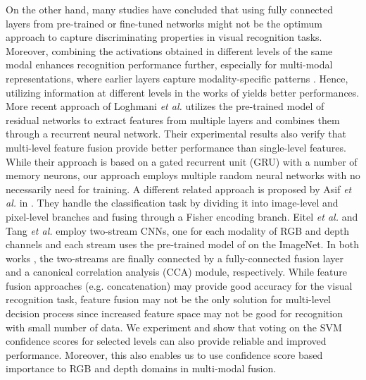 \documentclass[10pt,journal,compsoc]{IEEEtran}
\begin{document}
On the other hand, many studies \cite{Liu_CVPR_2015, Zaki_ICRA_2016, Zaki_RAS_2017, Song_IJCAI_2017, Caglayan_ECCVW_2018} have concluded that using fully connected layers from pre-trained or fine-tuned networks might not be the optimum approach to capture discriminating properties in visual recognition tasks. Moreover, combining the activations obtained in different levels of the same modal enhances recognition performance further, especially for multi-modal representations, where earlier layers capture modality-specific patterns \cite{Yang_ICCV_2015, Song_IJCAI_2017, Caglayan_ECCVW_2018}. Hence, utilizing information at different levels in the works of \cite{Yang_ICCV_2015, Zaki_ICRA_2016, Zaki_RAS_2017, Song_IJCAI_2017, Caglayan_ECCVW_2018, Zaki_AuotRobots_2019} yields better performances. More recent approach of Loghmani \textit{et al.} \cite{Loghmani_RAL_2019} utilizes the pre-trained model of residual networks \cite{He_CVPR_2016} to extract features from multiple layers and combines them through a recurrent neural network. Their experimental results also verify that multi-level feature fusion provide better performance than single-level features. While their approach is based on a gated recurrent unit (GRU) \cite{Cho_EMNLP_2014} with a number of memory neurons, our approach employs multiple random neural networks with no necessarily need for training. A different related approach is proposed by Asif \textit{et al.} in \cite{Asif_TPAMI_2018}. They handle the classification task by dividing it into image-level and pixel-level branches and fusing through a Fisher encoding branch. Eitel \textit{et al.} \cite{Eitel_IROS_2015} and Tang \textit{et al.} \cite{Tang_TCDS_2019} employ two-stream CNNs, one for each modality of RGB and depth channels and each stream uses the pre-trained model of \cite{Krizhevsky_NIPS_2012} on the ImageNet. In both works \cite{Eitel_IROS_2015, Tang_TCDS_2019}, the two-streams are finally connected by a fully-connected fusion layer and a canonical correlation analysis (CCA) module, respectively. While feature fusion approaches (e.g. concatenation) may provide good accuracy for the visual recognition task, feature fusion may not be the only solution for multi-level decision process since increased feature space may not be good for recognition with small number of data. We experiment and show that voting on the SVM confidence scores for selected levels can also provide reliable and improved performance. Moreover, this also enables us to use confidence score based importance to RGB and depth domains in multi-modal fusion.
\end{document}
